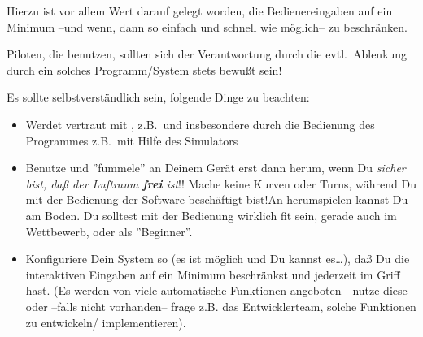 Hierzu ist vor allem Wert darauf gelegt worden, die Bedienereingaben auf ein Minimum --und wenn, dann so einfach und 
schnell wie möglich-- zu beschränken. 
 
Piloten, die  \xc benutzen, sollten sich der Verantwortung durch die evtl.\ Ablenkung durch ein solches Programm/System stets bewußt sein!

Es sollte selbstverständlich sein, folgende Dinge zu beachten:
\begin{itemize}
\item Werdet vertraut mit \xc, z.B.\ und insbesondere durch die Bedienung des Programmes z.B.\ mit Hilfe des Simulators
\item Benutze und ''fummele'' an Deinem Gerät erst dann herum, wenn Du {\sl sicher bist, daß der Luftraum {\bf frei} ist}!! 
Mache keine Kurven oder Turns, während Du mit der Bedienung der Software beschäftigt bist!An \xc herumspielen kannst Du am Boden. 
Du solltest mit der Bedienung wirklich fit sein, gerade auch im Wettbewerb, oder als ''Beginner''.
\item Konfiguriere Dein System so (es ist möglich und Du kannst es\dots), daß Du die interaktiven Eingaben auf ein Minimum beschränkst und 
jederzeit im Griff hast. (Es werden von \xc viele automatische Funktionen angeboten - nutze diese oder --falls nicht vorhanden-- 
frage z.B. das Entwicklerteam,  solche Funktionen zu entwickeln/ implementieren).   
\end{itemize}

